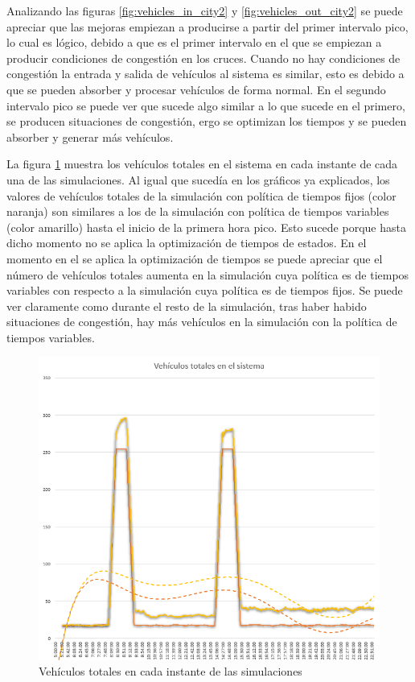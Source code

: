 Analizando las figuras \ref{fig:vehicles_in_city2} y \ref{fig:vehicles_out_city2} se puede apreciar que las mejoras empiezan a producirse a partir del primer intervalo pico, lo cual es lógico, debido a que es el primer intervalo en el que se empiezan a producir condiciones de congestión en los cruces. Cuando no hay condiciones de congestión la entrada y salida de vehículos al sistema es similar, esto es debido a que se pueden absorber y procesar vehículos de forma normal. En el segundo intervalo pico se puede ver que sucede algo similar a lo que sucede en el primero, se producen situaciones de congestión, ergo se optimizan los tiempos y se pueden absorber y generar más vehículos.

La figura \ref{fig:vehicles_total_city2} muestra los vehículos totales en el sistema en cada instante de cada una de las simulaciones. Al igual que sucedía en los gráficos ya explicados, los valores de vehículos totales de la simulación con política de tiempos fijos (color naranja) son similares a los de la simulación con política de tiempos variables (color amarillo) hasta el inicio de la primera hora pico. Esto sucede porque hasta dicho momento no se aplica la optimización de tiempos de estados. En el momento en el se aplica la optimización de tiempos se puede apreciar que el número de vehículos totales aumenta en la simulación cuya política es de tiempos variables con respecto a la simulación cuya política es de tiempos fijos. Se puede ver claramente como durante el resto de la simulación, tras haber habido situaciones de congestión, hay más vehículos en la simulación con la política de tiempos variables. 

\begin{figure}[H]
    \centering
    \includegraphics[width=0.84\linewidth]{text/image/SIMtotalVehiclesCITY2-CONFIG2.png}
    \caption{Vehículos totales en cada instante de las simulaciones}
    \label{fig:vehicles_total_city2}
\end{figure}

